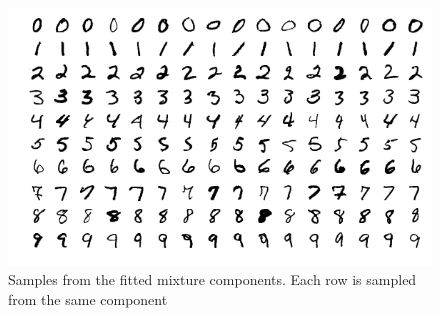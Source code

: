\begin{figure}[!htb]
  \centering
  \includegraphics[width=0.85\linewidth]{figures/trained_mnist.png}
  \caption{Samples from the fitted mixture components. Each row is sampled
  from the same component}
  \label{fig:mnist_samples}
\end{figure}


